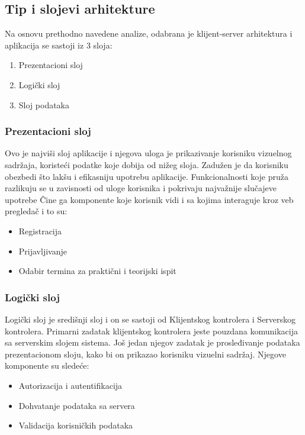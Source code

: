 \subsection{Tip i slojevi arhitekture}
Na osnovu prethodno navedene analize, odabrana je klijent-server arhitektura i aplikacija se sastoji iz 3 sloja:
\begin{enumerate}
\item Prezentacioni sloj
\item Logički sloj
\item Sloj podataka
\end{enumerate}

\subsubsection{Prezentacioni sloj}

Ovo je najviši sloj aplikacije i njegova uloga je prikazivanje korisniku vizuelnog sadržaja,
koristeći podatke koje dobija od nižeg sloja.
Zadužen je da korisniku obezbedi što lakšu i efikasniju upotrebu aplikacije.
Funkcionalnosti koje pruža razlikuju se u zavisnosti od uloge korisnika i pokrivaju najvažnije slučajeve upotrebe 
Čine ga komponente koje korisnik vidi i sa kojima interaguje kroz veb pregledač i to su:

\begin{itemize}
    \item Registracija
    \item Prijavljivanje
    \item Odabir termina za praktični i teorijski ispit
\end{itemize}


\subsubsection{Logički sloj}

Logički sloj je središnji sloj i on se sastoji od Klijentskog kontrolera i Serverskog kontrolera.
Primarni zadatak klijentskog kontrolera jeste pouzdana komunikacija sa serverskim slojem sistema. 
Još jedan njegov zadatak je prosleđivanje podataka prezentacionom sloju, kako bi on prikazao korisniku vizuelni sadržaj.
Njegove komponente su sledeće:

\begin{itemize}
    \item Autorizacija i autentifikacija
    \item Dohvatanje podataka sa servera
    \item Validacija korisničkih podataka
\end{itemize}


